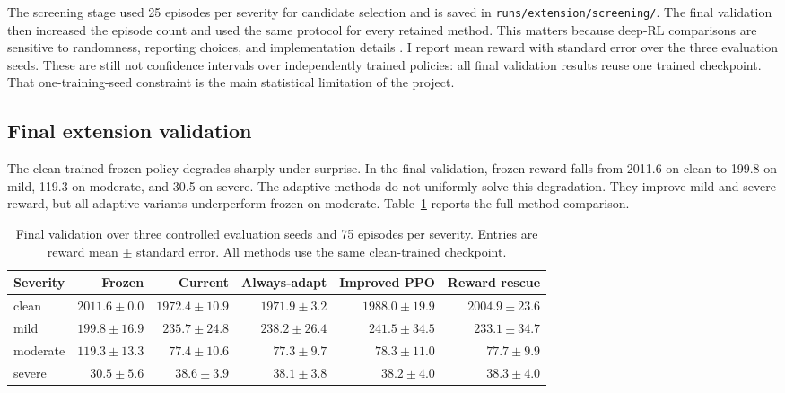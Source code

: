 \documentclass{article}
\begin{document}
The screening stage used 25 episodes per severity for candidate selection and is saved in \texttt{runs/extension/screening/}. The final validation then increased the episode count and used the same protocol for every retained method. This matters because deep-RL comparisons are sensitive to randomness, reporting choices, and implementation details \citep{henderson2018deep,patterson2024empirical}. I report mean reward with standard error over the three evaluation seeds. These are still not confidence intervals over independently trained policies: all final validation results reuse one trained checkpoint. That one-training-seed constraint is the main statistical limitation of the project.

\subsection{Final extension validation}

The clean-trained frozen policy degrades sharply under surprise. In the final validation, frozen reward falls from 2011.6 on clean to 199.8 on mild, 119.3 on moderate, and 30.5 on severe. The adaptive methods do not uniformly solve this degradation. They improve mild and severe reward, but all adaptive variants underperform frozen on moderate. Table~\ref{tab:validation-results} reports the full method comparison.

\begin{table}[t]
  \centering
  \scriptsize
  \caption{Final validation over three controlled evaluation seeds and 75 episodes per severity. Entries are reward mean $\pm$ standard error. All methods use the same clean-trained checkpoint.}
  \label{tab:validation-results}
  \begin{tabular}{lrrrrr}
    \toprule
    Severity & Frozen & Current & Always-adapt & Improved PPO & Reward rescue \\
    \midrule
    clean & $2011.6 \pm 0.0$ & $1972.4 \pm 10.9$ & $1971.9 \pm 3.2$ & $1988.0 \pm 19.9$ & $\mathbf{2004.9 \pm 23.6}$ \\
    mild & $199.8 \pm 16.9$ & $235.7 \pm 24.8$ & $238.2 \pm 26.4$ & $\mathbf{241.5 \pm 34.5}$ & $233.1 \pm 34.7$ \\
    moderate & $\mathbf{119.3 \pm 13.3}$ & $77.4 \pm 10.6$ & $77.3 \pm 9.7$ & $78.3 \pm 11.0$ & $77.7 \pm 9.9$ \\
    severe & $30.5 \pm 5.6$ & $\mathbf{38.6 \pm 3.9}$ & $38.1 \pm 3.8$ & $38.2 \pm 4.0$ & $38.3 \pm 4.0$ \\
    \bottomrule
  \end{tabular}
\end{table}
\end{document}
